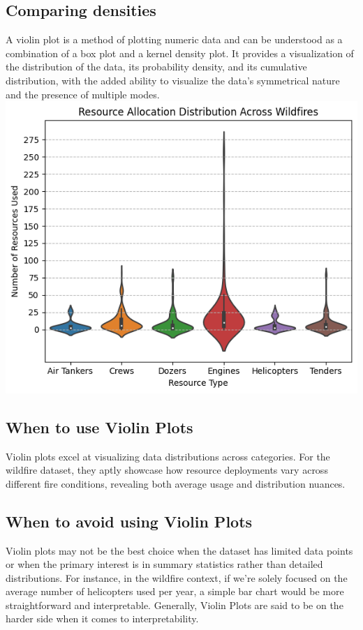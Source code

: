 \begin{multicols}{2}
\section*{Comparing densities}
A violin plot is a method of plotting numeric data and can be understood as a combination of a box plot and a kernel density plot. It provides a visualization of the distribution of the data, its probability density, and its cumulative distribution, with the added ability to visualize the data's symmetrical nature and the presence of multiple modes.
\includegraphics[width=\columnwidth]{Images/figures/violin_1.png}
\subsection*{When to use Violin Plots}
Violin plots excel at visualizing data distributions across categories. For the wildfire dataset, they aptly showcase how resource deployments vary across different fire conditions, revealing both average usage and distribution nuances.
\subsection*{When to avoid using Violin Plots}
Violin plots may not be the best choice when the dataset has limited data points or when the primary interest is in summary statistics rather than detailed distributions. For instance, in the wildfire context, if we're solely focused on the average number of helicopters used per year, a simple bar chart would be more straightforward and interpretable. Generally, Violin Plots are said to be on the harder side when it comes to interpretability.


\end{multicols}
